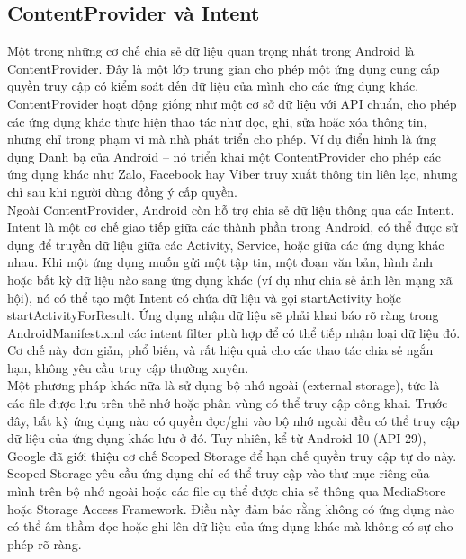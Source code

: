 \subsection{ContentProvider và Intent}    
    \begin{flushleft}
        \hspace*{0.8cm}Một trong những cơ chế chia sẻ dữ liệu quan trọng nhất trong Android là ContentProvider. Đây là một lớp trung gian cho phép một ứng dụng cung cấp quyền truy cập có kiểm soát đến dữ liệu của mình cho các ứng dụng khác. ContentProvider hoạt động giống như một cơ sở dữ liệu với API chuẩn, cho phép các ứng dụng khác thực hiện thao tác như đọc, ghi, sửa hoặc xóa thông tin, nhưng chỉ trong phạm vi mà nhà phát triển cho phép. Ví dụ điển hình là ứng dụng Danh bạ của Android – nó triển khai một ContentProvider cho phép các ứng dụng khác như Zalo, Facebook hay Viber truy xuất thông tin liên lạc, nhưng chỉ sau khi người dùng đồng ý cấp quyền.\\
        \hspace*{0.8cm}Ngoài ContentProvider, Android còn hỗ trợ chia sẻ dữ liệu thông qua các Intent. Intent là một cơ chế giao tiếp giữa các thành phần trong Android, có thể được sử dụng để truyền dữ liệu giữa các Activity, Service, hoặc giữa các ứng dụng khác nhau. Khi một ứng dụng muốn gửi một tập tin, một đoạn văn bản, hình ảnh hoặc bất kỳ dữ liệu nào sang ứng dụng khác (ví dụ như chia sẻ ảnh lên mạng xã hội), nó có thể tạo một Intent có chứa dữ liệu và gọi startActivity hoặc startActivityForResult. Ứng dụng nhận dữ liệu sẽ phải khai báo rõ ràng trong AndroidManifest.xml các intent filter phù hợp để có thể tiếp nhận loại dữ liệu đó. Cơ chế này đơn giản, phổ biến, và rất hiệu quả cho các thao tác chia sẻ ngắn hạn, không yêu cầu truy cập thường xuyên.\\
        \hspace*{0.8cm}Một phương pháp khác nữa là sử dụng bộ nhớ ngoài (external storage), tức là các file được lưu trên thẻ nhớ hoặc phân vùng có thể truy cập công khai. Trước đây, bất kỳ ứng dụng nào có quyền đọc/ghi vào bộ nhớ ngoài đều có thể truy cập dữ liệu của ứng dụng khác lưu ở đó. Tuy nhiên, kể từ Android 10 (API 29), Google đã giới thiệu cơ chế Scoped Storage để hạn chế quyền truy cập tự do này. Scoped Storage yêu cầu ứng dụng chỉ có thể truy cập vào thư mục riêng của mình trên bộ nhớ ngoài hoặc các file cụ thể được chia sẻ thông qua MediaStore hoặc Storage Access Framework. Điều này đảm bảo rằng không có ứng dụng nào có thể âm thầm đọc hoặc ghi lên dữ liệu của ứng dụng khác mà không có sự cho phép rõ ràng.
    \end{flushleft}


